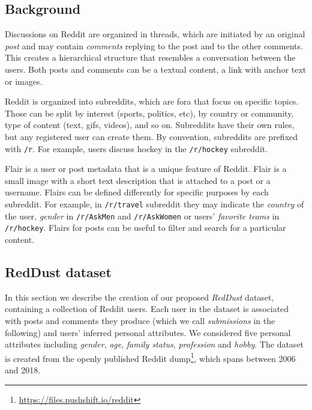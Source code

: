 \subsection{Background}


Discussions on Reddit are organized in threads, which are initiated by an original \textit{post} and may contain \textit{comments} replying to the post and to the other comments. This creates a hierarchical structure that resembles a conversation between the users.
Both posts and comments can be a textual content, a link with anchor text or images.

Reddit is organized into subreddits, which are fora that focus on specific topics.
Those can be split by interest (sports, politics, etc), by country or community, type of content (text, gifs, videos), and so on. Subreddits have their own rules, but any registered user can create them. By convention, subreddits are prefixed with \texttt{\small /r}. For example, users discuss hockey in the \texttt{\small /r/hockey} subreddit.

Flair is a user or post metadata that is a unique feature of Reddit. Flair is a small image with a short text description that is attached to a post or a username. Flairs can be defined differently for specific purposes by each subreddit. For example, in \texttt{\small /r/travel} subreddit they may indicate the \textit{country} of the user, \textit{gender} in \texttt{\small /r/AskMen} and \texttt{\small /r/AskWomen} or users' \textit{favorite teams} in \texttt{\small /r/hockey}.
Flairs for posts can be useful to filter and search for a particular content.

\subsection{RedDust dataset}

In this section we describe the creation of our proposed \emph{RedDust} dataset, containing a collection of Reddit users. Each user in the dataset is associated with posts and comments they produce (which we call \textit{submissions} in the following) and users' inferred personal attributes.
We considered five personal attributes including \textit{gender}, \textit{age}, \textit{family status}, \textit{profession} and \textit{hobby}.
The dataset is created from the openly published \gls{Reddit dump}\footnote{ \href{https://files.pushshift.io/reddit}{https://files.pushshift.io/reddit}}, which spans between 2006 and 2018. 

